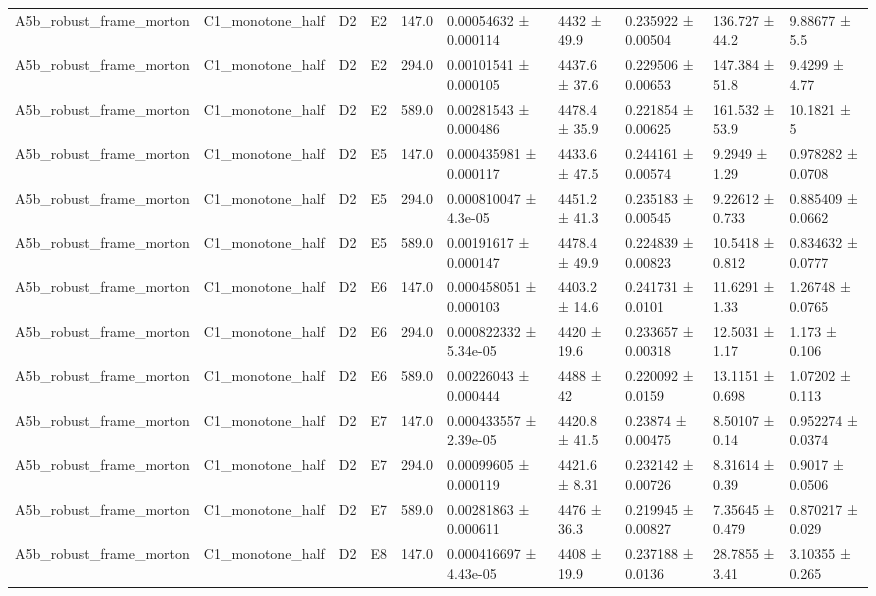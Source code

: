 \begin{table}
\begin{tabular}{llllllllll}
A5b\_robust\_frame\_morton & C1\_monotone\_half & D2 & E2 & 147.0 & 0.00054632 ± 0.000114 & 4432 ± 49.9 & 0.235922 ± 0.00504 & 136.727 ± 44.2 & 9.88677 ± 5.5 \\
A5b\_robust\_frame\_morton & C1\_monotone\_half & D2 & E2 & 294.0 & 0.00101541 ± 0.000105 & 4437.6 ± 37.6 & 0.229506 ± 0.00653 & 147.384 ± 51.8 & 9.4299 ± 4.77 \\
A5b\_robust\_frame\_morton & C1\_monotone\_half & D2 & E2 & 589.0 & 0.00281543 ± 0.000486 & 4478.4 ± 35.9 & 0.221854 ± 0.00625 & 161.532 ± 53.9 & 10.1821 ± 5 \\
A5b\_robust\_frame\_morton & C1\_monotone\_half & D2 & E5 & 147.0 & 0.000435981 ± 0.000117 & 4433.6 ± 47.5 & 0.244161 ± 0.00574 & 9.2949 ± 1.29 & 0.978282 ± 0.0708 \\
A5b\_robust\_frame\_morton & C1\_monotone\_half & D2 & E5 & 294.0 & 0.000810047 ± 4.3e-05 & 4451.2 ± 41.3 & 0.235183 ± 0.00545 & 9.22612 ± 0.733 & 0.885409 ± 0.0662 \\
A5b\_robust\_frame\_morton & C1\_monotone\_half & D2 & E5 & 589.0 & 0.00191617 ± 0.000147 & 4478.4 ± 49.9 & 0.224839 ± 0.00823 & 10.5418 ± 0.812 & 0.834632 ± 0.0777 \\
A5b\_robust\_frame\_morton & C1\_monotone\_half & D2 & E6 & 147.0 & 0.000458051 ± 0.000103 & 4403.2 ± 14.6 & 0.241731 ± 0.0101 & 11.6291 ± 1.33 & 1.26748 ± 0.0765 \\
A5b\_robust\_frame\_morton & C1\_monotone\_half & D2 & E6 & 294.0 & 0.000822332 ± 5.34e-05 & 4420 ± 19.6 & 0.233657 ± 0.00318 & 12.5031 ± 1.17 & 1.173 ± 0.106 \\
A5b\_robust\_frame\_morton & C1\_monotone\_half & D2 & E6 & 589.0 & 0.00226043 ± 0.000444 & 4488 ± 42 & 0.220092 ± 0.0159 & 13.1151 ± 0.698 & 1.07202 ± 0.113 \\
A5b\_robust\_frame\_morton & C1\_monotone\_half & D2 & E7 & 147.0 & 0.000433557 ± 2.39e-05 & 4420.8 ± 41.5 & 0.23874 ± 0.00475 & 8.50107 ± 0.14 & 0.952274 ± 0.0374 \\
A5b\_robust\_frame\_morton & C1\_monotone\_half & D2 & E7 & 294.0 & 0.00099605 ± 0.000119 & 4421.6 ± 8.31 & 0.232142 ± 0.00726 & 8.31614 ± 0.39 & 0.9017 ± 0.0506 \\
A5b\_robust\_frame\_morton & C1\_monotone\_half & D2 & E7 & 589.0 & 0.00281863 ± 0.000611 & 4476 ± 36.3 & 0.219945 ± 0.00827 & 7.35645 ± 0.479 & 0.870217 ± 0.029 \\
A5b\_robust\_frame\_morton & C1\_monotone\_half & D2 & E8 & 147.0 & 0.000416697 ± 4.43e-05 & 4408 ± 19.9 & 0.237188 ± 0.0136 & 28.7855 ± 3.41 & 3.10355 ± 0.265 \\

\end{tabular}
\end{table}

